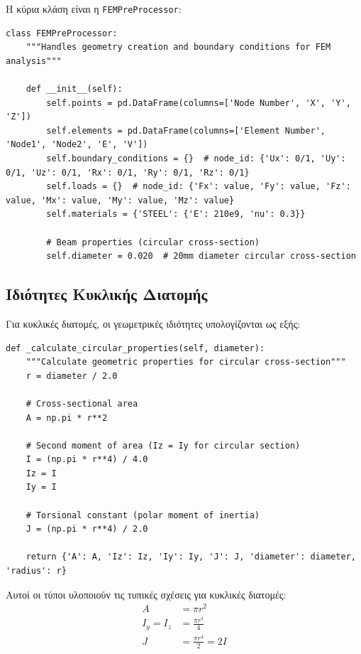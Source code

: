 \documentclass[12pt,a4paper]{article}
\begin{document}
Η κύρια κλάση είναι η \texttt{FEMPreProcessor}:

\begin{lstlisting}[caption={Αρχικοποίηση Κλάσης FEMPreProcessor}]
class FEMPreProcessor:
    """Handles geometry creation and boundary conditions for FEM analysis"""
    
    def __init__(self):
        self.points = pd.DataFrame(columns=['Node Number', 'X', 'Y', 'Z'])
        self.elements = pd.DataFrame(columns=['Element Number', 'Node1', 'Node2', 'E', 'V'])
        self.boundary_conditions = {}  # node_id: {'Ux': 0/1, 'Uy': 0/1, 'Uz': 0/1, 'Rx': 0/1, 'Ry': 0/1, 'Rz': 0/1}
        self.loads = {}  # node_id: {'Fx': value, 'Fy': value, 'Fz': value, 'Mx': value, 'My': value, 'Mz': value}
        self.materials = {'STEEL': {'E': 210e9, 'nu': 0.3}}
        
        # Beam properties (circular cross-section)
        self.diameter = 0.020  # 20mm diameter circular cross-section
\end{lstlisting}

\subsection{Ιδιότητες Κυκλικής Διατομής}

Για κυκλικές διατομές, οι γεωμετρικές ιδιότητες υπολογίζονται ως εξής:

\begin{lstlisting}[caption={Υπολογισμός Ιδιοτήτων Κυκλικής Διατομής}]
def _calculate_circular_properties(self, diameter):
    """Calculate geometric properties for circular cross-section"""
    r = diameter / 2.0
    
    # Cross-sectional area
    A = np.pi * r**2
    
    # Second moment of area (Iz = Iy for circular section)
    I = (np.pi * r**4) / 4.0
    Iz = I
    Iy = I
    
    # Torsional constant (polar moment of inertia)
    J = (np.pi * r**4) / 2.0
    
    return {'A': A, 'Iz': Iz, 'Iy': Iy, 'J': J, 'diameter': diameter, 'radius': r}
\end{lstlisting}

Αυτοί οι τύποι υλοποιούν τις τυπικές σχέσεις για κυκλικές διατομές:
\begin{align}
A &= \pi r^2 \\
I_y = I_z &= \frac{\pi r^4}{4} \\
J &= \frac{\pi r^4}{2} = 2I
\end{align}
\end{document}
